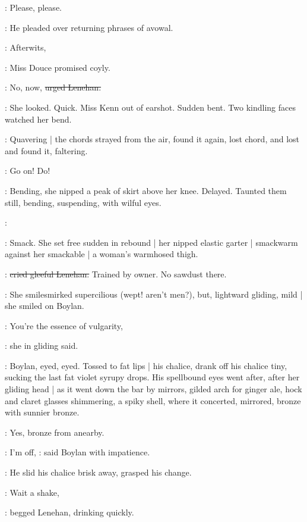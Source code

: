 \lenehan:
Please, please.

:
He pleaded over returning phrases of avowal.


\MissD:
Afterwits,

:
Miss Douce promised coyly.

\lenehan:
No, now,
\sout{urged Lenehan.}

:
She looked.
Quick.
Miss Kenn out of earshot.
Sudden bent.
Two kindling faces watched her bend.

:
Quavering |
the chords strayed from the air,
found it again,
lost chord,
and lost and found it,
faltering.

\lenehan:
Go on! Do! 

:
Bending,
she nipped a peak of skirt above her knee.
Delayed.
Taunted them still,
bending,
suspending,
with wilful eyes.

\lenehan:

:
Smack.
She set free sudden in rebound |
her nipped elastic garter |
smackwarm against her smackable |
a woman's warmhosed thigh.

\lenehan:
\sout{cried gleeful Lenehan.}
Trained by owner.
No sawdust there.

:
She smilesmirked supercilious
(wept! aren't men?),
but, lightward gliding, mild |
she smiled on Boylan.

\MissD:
You're the essence of vulgarity,

:
she in gliding said.

:
Boylan, eyed, eyed.
Tossed to fat lips |
his chalice,
drank off his chalice tiny,
sucking the last fat violet syrupy drops.
His spellbound eyes went after,
after her gliding head |
as it went down the bar by mirrors,
gilded arch for ginger ale,
hock and claret glasses shimmering,
a spiky shell,
where it concerted,
mirrored,
bronze with sunnier bronze.

:
Yes, bronze from anearby.


\boylan:
I'm off,
:
said Boylan with impatience.

:
He slid his chalice brisk away,
grasped his change.

\lenehan:
Wait a shake,

:
begged Lenehan, drinking quickly.

